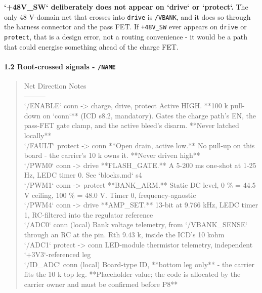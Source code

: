 \documentclass[11pt,a4paper]{article}
\begin{document}
\textbf{`+48V\_SW` deliberately does not appear on `drive` or `protect`.} The only 48 V-domain net that crosses into \texttt{drive} is \texttt{/VBANK}, and it does so through the harness connector and the pass FET. If \texttt{+48V\_SW} ever appears on \texttt{drive} or \texttt{protect}, that is a design error, not a routing convenience - it would be a path that could energise something ahead of the charge FET.

\paragraph*{1.2 Root-crossed signals - \texttt{/NAME}}
\begin{quote}\small\ttfamily\raggedright
\textbar{} Net \textbar{} Direction \textbar{} Notes \textbar{}\\
\textbar{}---\textbar{}---\textbar{}---\textbar{}\\
\textbar{} `/ENABLE` \textbar{} conn -\textgreater{} charge, drive, protect \textbar{} Active HIGH. {*}{*}100 k pull-down on `conn`{*}{*} (ICD s8.2, mandatory). Gates the charge path's EN, the pass-FET gate clamp, and the active bleed's disarm. {*}{*}Never latched locally{*}{*} \textbar{}\\
\textbar{} `/FAULT` \textbar{} protect -\textgreater{} conn \textbar{} {*}{*}Open drain, active low.{*}{*} No pull-up on this board - the carrier's 10 k owns it. {*}{*}Never driven high{*}{*} \textbar{}\\
\textbar{} `/PWM0` \textbar{} conn -\textgreater{} drive \textbar{} {*}{*}FLASH\_GATE.{*}{*} A 5-200 ms one-shot at 1-25 Hz, LEDC timer 0. See `blocks.md` s4 \textbar{}\\
\textbar{} `/PWM1` \textbar{} conn -\textgreater{} protect \textbar{} {*}{*}BANK\_ARM.{*}{*} Static DC level, 0 \% = 44.5 V ceiling, 100 \% = 48.0 V. Timer 0, frequency-agnostic \textbar{}\\
\textbar{} `/PWM4` \textbar{} conn -\textgreater{} drive \textbar{} {*}{*}AMP\_SET.{*}{*} 13-bit at 9.766 kHz, LEDC timer 1, RC-filtered into the regulator reference \textbar{}\\
\textbar{} `/ADC0` \textbar{} conn (local) \textbar{} Bank voltage telemetry, from `/VBANK\_SENSE` through an RC at the pin. Rth 9.43 k, inside the ICD's 10 kohm \textbar{}\\
\textbar{} `/ADC1` \textbar{} protect -\textgreater{} conn \textbar{} LED-module thermistor telemetry, independent `+3V3`-referenced leg \textbar{}\\
\textbar{} `/ID\_ADC` \textbar{} conn (local) \textbar{} Board-type ID, {*}{*}bottom leg only{*}{*} - the carrier fits the 10 k top leg. {*}{*}Placeholder value; the code is allocated by the carrier owner and must be confirmed before P8{*}{*} \textbar{}\\

\end{quote}
\end{document}
